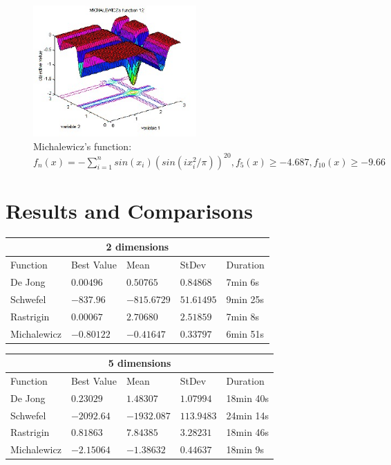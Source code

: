 \documentclass[12pt,leqno]{article}
\begin{document}
\begin{figure}[bp!]
  \centering
  \includegraphics[width=0.4\linewidth, height=5cm]{michalenwicz.jpg}
  \caption*{Michalewicz's function: $ f_n(x) = -\sum_{i = 1}^{n} sin(x_i) (sin(i x_i^2 / \pi)) ^ 20, f_5(x) \geq -4.687, f_{10}(x) \geq -9.66$}  
\end{figure}

\vfill
\clearpage

\section{Results and Comparisons}

\begin{center}
  \begin{tabular}{|p{2.3cm}||p{3cm}|p{2cm}|p{2cm}|p{4.3cm}|} 
    \hline
    \multicolumn{5}{|c|}{2 dimensions} \\
    \hline
    Function    & Best Value & Mean & StDev & Duration \\ 
    \hline\hline
    De Jong     & $ 0.00496 $ & $ 0.50765 $ & $ 0.84868 $ & 7min 6s \\ 
    \hline
    Schwefel    & $ -837.96 $ & $ -815.6729 $ & $ 51.61495 $ & 9min 25s \\ 
    \hline
    Rastrigin   & $ 0.00067 $ & $ 2.70680 $ & $ 2.51859 $ & 7min 8s \\ 
    \hline
    Michalewicz & $ -0.80122 $ & $ -0.41647 $ & $ 0.33797 $ & 6min 51s \\ 
    \hline
 \end{tabular}
\end{center}

\begin{center}
  \begin{tabular}{|p{2.3cm}||p{3cm}|p{2cm}|p{2cm}|p{4.3cm}|} 
    \hline
    \multicolumn{5}{|c|}{5 dimensions} \\
    \hline
    Function    & Best Value & Mean & StDev & Duration \\ 
    \hline\hline
    De Jong     & $ 0.23029 $ & $ 1.48307 $ & $ 1.07994 $ & 18min 40s \\ 
    \hline
    Schwefel    & $ -2092.64 $ & $ -1932.087 $ & $ 113.9483 $ & 24min 14s \\ 
    \hline
    Rastrigin   & $ 0.81863 $ & $ 7.84385 $ & $ 3.28231 $ & 18min 46s \\ 
    \hline
    Michalewicz & $ -2.15064 $ & $ -1.38632 $ & $ 0.44637 $ & 18min 9s \\ 
    \hline
 \end{tabular}
\end{center}
\end{document}
